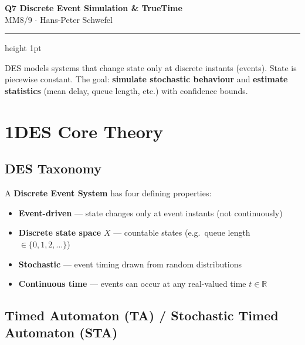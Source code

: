 \documentclass[10pt,a4paper]{article}
\begin{document}

\begin{center}
  {\large\bfseries\color{headernavy} Q7 \textemdash{} Discrete Event Simulation \& TrueTime}\\[1pt]
  {\small MM8/9 $\cdot$ Hans-Peter Schwefel}
\end{center}
\vspace{1pt}\hrule height 1pt\vspace{5pt}

DES models systems that change state only at discrete instants (events). State is piecewise constant.
The goal: \textbf{simulate stochastic behaviour} and \textbf{estimate statistics} (mean delay, queue length, etc.) with confidence bounds.

\section*{1\quad DES Core Theory}

\subsection*{DES Taxonomy}
A \textbf{Discrete Event System} has four defining properties:
\begin{itemize}
  \item \textbf{Event-driven} --- state changes only at event instants (not continuously)
  \item \textbf{Discrete state space} $X$ --- countable states (e.g.\ queue length $\in \{0,1,2,\ldots\}$)
  \item \textbf{Stochastic} --- event timing drawn from random distributions
  \item \textbf{Continuous time} --- events can occur at any real-valued time $t \in \mathbb{R}$
\end{itemize}

\subsection*{Timed Automaton (TA) / Stochastic Timed Automaton (STA)}
\end{document}
